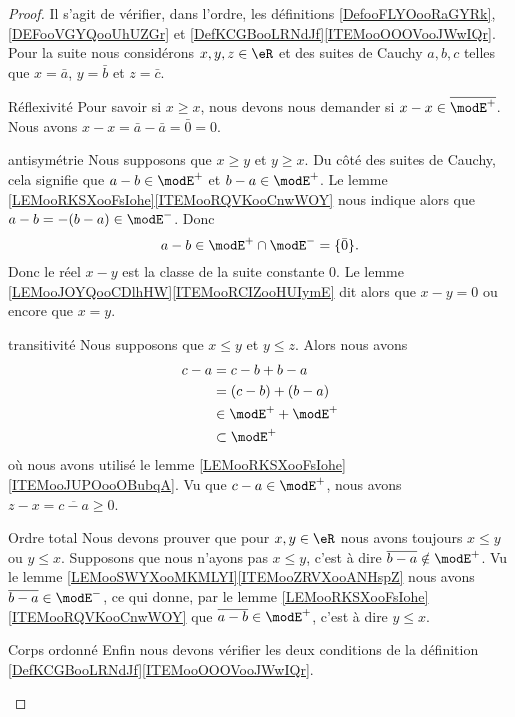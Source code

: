 \begin{proof}
    Il s'agit de vérifier, dans l'ordre, les définitions \ref{DefooFLYOooRaGYRk}, \ref{DEFooVGYQooUhUZGr} et \ref{DefKCGBooLRNdJf}\ref{ITEMooOOOVooJWwIQr}. Pour la suite nous considérons \( x,y,z\in \eR\) et des suites de Cauchy \( a,b,c\) telles que \( x=\bar a\), \( y=\bar b\) et \( z=\bar c\).
    \begin{subproof}
    \item[Réflexivité]
        Pour savoir si \( x\geq x\), nous devons nous demander si \( x-x\in\overline{ \modE^+ }\). Nous avons \( x-x=\bar a-\bar a=\bar 0=0\).
    \item[antisymétrie]
        Nous supposons que \( x\geq y\) et \( y\geq x\). Du côté des suites de Cauchy, cela signifie que \( a-b\in\modE^+\) et \( b-a\in \modE^+\). Le lemme \ref{LEMooRKSXooFsIohe}\ref{ITEMooRQVKooCnwWOY} nous indique alors que \( a-b=-(b-a)\in \modE^-\). Donc
        \begin{equation}
            a-b\in\modE^+\cap\modE^-=\{ \bar 0 \}.
        \end{equation}
        Donc le réel \( x-y\) est la classe de la suite constante \( 0\). Le lemme \ref{LEMooJOYQooCDlhHW}\ref{ITEMooRCIZooHUIymE} dit alors que \( x-y=0\) ou encore que \( x=y\).
    \item[transitivité]
        Nous supposons que \( x\leq y\) et \( y\leq z\). Alors nous avons
        \begin{subequations}
            \begin{align}
                c-a&=c-b+b-a\\
                &=(c-b)+(b-a)\\
                &\in \modE^++\modE^+\\
                &\subset \modE^+
            \end{align}
        \end{subequations}
        où nous avons utilisé le lemme \ref{LEMooRKSXooFsIohe}\ref{ITEMooJUPOooOBubqA}. Vu que \( c-a\in\modE^+\), nous avons \( z-x=\overline{ c-a }\geq 0\).
    \item[Ordre total]
        Nous devons prouver que pour \( x,y\in \eR\) nous avons toujours \( x\leq y\) ou \( y\leq x\). Supposons que nous n'ayons pas \( x\leq y\), c'est à dire \( \overline{ b-a }\notin \modE^+\). Vu le lemme \ref{LEMooSWYXooMKMLYI}\ref{ITEMooZRVXooANHspZ} nous avons \( \overline{ b-a }\in \modE^-\), ce qui donne, par le lemme \ref{LEMooRKSXooFsIohe}\ref{ITEMooRQVKooCnwWOY} que \( \overline{ a-b }\in \modE^+\), c'est à dire \( y\leq x\).
    \item[Corps ordonné]
        Enfin nous devons vérifier les deux conditions de la définition \ref{DefKCGBooLRNdJf}\ref{ITEMooOOOVooJWwIQr}.


\end{subproof}
\end{proof}

